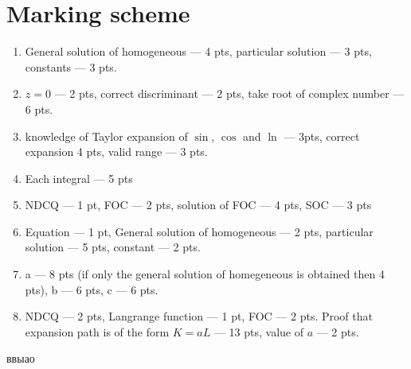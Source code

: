 \documentclass[12pt]{article}
\begin{document}
\section{Marking scheme}

\begin{enumerate}
\item General solution of homogeneous --- 4 pts, particular solution --- 3 pts, constants --- 3 pts.
\item $z=0$ --- 2 pts, correct discriminant  --- 2 pts, take root of complex number --- 6 pts.
\item knowledge of Taylor expansion of $\sin$, $\cos$ and $\ln$ --- 3pts, correct expansion 4 pts, valid range --- 3 pts.
\item Each integral --- 5 pts
\item NDCQ --- 1 pt, FOC --- 2 pts, solution of FOC --- 4 pts, SOC --- 3 pts
\item Equation --- 1 pt, General solution of homogeneous --- 2 pts, particular solution --- 5 pts, constant --- 2 pts.
\item a --- 8 pts (if only the general solution of homegeneous is obtained then 4 pts), b --- 6 pts, c --- 6 pts.
\item NDCQ --- 2 pts, Langrange function --- 1 pt, FOC --- 2 pts. Proof that expansion path is of the form $K=aL$ --- 13 pts, value of $a$ --- 2 pts. 
\end{enumerate}

ввыао
\end{document}
